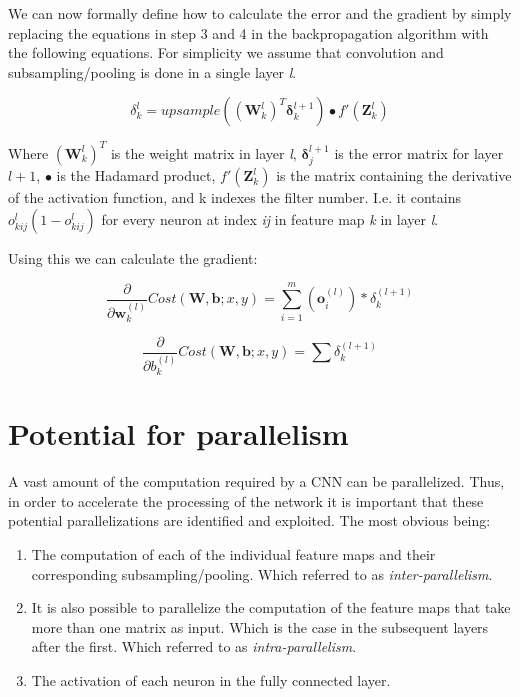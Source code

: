 We can now formally define how to calculate the error and the gradient by simply replacing the equations in step 3 and 4 in the backpropagation algorithm with the following equations. For simplicity we assume that convolution and subsampling/pooling is done in a single layer \textit{l}.




\begin{equation}
	\delta_{k}^{l} =  upsample( (\mathbf{W}_{k}^l)^T \mathbf{\delta}_{k}^{l+1})\bullet f'(\mathbf{Z}_k^l)
\end{equation}

Where $  (\mathbf{W}_{k}^l)^T $ is the weight matrix in layer \textit{l}, $  \mathbf{\delta}_{j}^{l+1} $ is the error matrix for layer $ l + 1 $, $ \bullet $ is the Hadamard product, $ f'(\mathbf{Z}_k^l) $ is the matrix containing the derivative of the activation function, and k indexes the filter number. I.e. it contains $ o_{kij}^l(1-o_{kij}^l) $ for every neuron at index \textit{ij} in feature map \textit{k} in layer \textit{l}. 

Using this we can calculate the gradient:

\begin{equation}
	\frac{\partial}{\partial \mathbf{w}_k^{(l)} }Cost(\mathbf{W,b}; x, y) = \sum_{i=1}^{m}(\mathbf{o}_i^{(l)})*\delta_k^{(l+1)}
\end{equation}

\begin{equation}
	\frac{\partial}{\partial b_k^{(l)} }Cost(\mathbf{W,b}; x, y) = \sum\delta_k^{(l+1)}
\end{equation}

\section{Potential for parallelism} \label{sec_pot_parallelism} 

A vast amount of the computation required by a CNN can be parallelized. Thus, in order to accelerate the processing of the network it is important that these potential parallelizations are identified and exploited. The most obvious being:

\begin{enumerate}
	\item The computation of each of the individual feature maps and their corresponding subsampling/pooling. Which \cite{Chakradhar2010} referred to as \textit{inter-parallelism}.
	\item It is also possible to parallelize the computation of the feature maps that take more than one matrix as input. Which is the case in the subsequent layers after the first. Which \cite{Chakradhar2010} referred to as \textit{intra-parallelism}.
	\item The activation of each neuron in the fully connected layer. 	
\end{enumerate}

